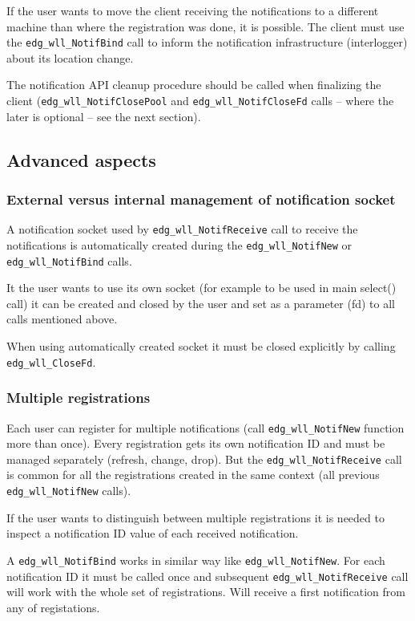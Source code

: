 If the user wants to move the client receiving the notifications to a different
machine than where the registration was done, it is possible. The
client must use the \verb'edg_wll_NotifBind' call to inform the
notification infrastructure (interlogger) about its location change.

The notification API cleanup procedure should be called when
finalizing the client (\verb'edg_wll_NotifClosePool' and 
\verb'edg_wll_NotifCloseFd' calls -- where the later is optional 
-- see the next section).

\subsection{Advanced aspects}

\subsubsection{External versus internal management of notification socket}
A notification socket used by \verb'edg_wll_NotifReceive' call to
receive the notifications is automatically created during the
\verb'edg_wll_NotifNew' or \verb'edg_wll_NotifBind' calls.

It the user wants to use its own socket (for example to be used in
main select() call) it can be created and closed by the user and set
as a parameter (fd) to all calls mentioned above.

When using automatically created socket it must be closed explicitly
by calling \verb'edg_wll_CloseFd'.

\subsubsection{Multiple registrations}
Each user can register for multiple notifications (call
\verb'edg_wll_NotifNew' function more than once). Every registration
gets its own notification ID and must be managed separately (refresh,
change, drop). But the \verb'edg_wll_NotifReceive' call is common for
all the registrations created in the same context (all previous
\verb'edg_wll_NotifNew' calls). 

If the user wants to distinguish between multiple registrations it is
needed to inspect a notification ID value of each received notification.

A \verb'edg_wll_NotifBind' works in similar way like
\verb'edg_wll_NotifNew'. For each notification ID it must be called
once and subsequent \verb'edg_wll_NotifReceive' call will work with
the whole set of registrations. Will receive a first notification from
any of registations.

